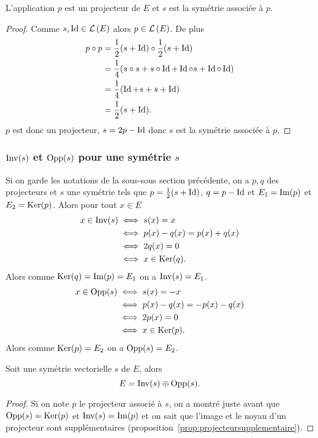 \begin{prop}
  L'application \(p\) est un projecteur de \(E\) et \(s\) est la symétrie
  associée à \(p\).
\end{prop}
\begin{proof}
  Comme \(s, \operatorname{Id} \in \mathcal{L}\left(E\right)\) alors \(p \in \mathcal{L}\left(E\right)\). De plus
  \begin{align}
    p \circ p &= \frac{1}{2}(s+\operatorname{Id}) \circ \frac{1}{2}(s+\operatorname{Id}) \\
    &=\frac{1}{4}(s \circ s + s\circ \operatorname{Id} +\operatorname{Id} \circ s +\operatorname{Id} \circ \operatorname{Id})\\
    &=\frac{1}{4}(\operatorname{Id} +s +s+\operatorname{Id})\\
    &=\frac{1}{2}(s+\operatorname{Id}).
  \end{align}
  \(p\) est donc un projecteur, \(s=2p-\operatorname{Id}\) donc \(s\) est la symétrie associée
  à \(p\).
\end{proof}

\subsubsection{\(\operatorname{Inv}(s)\) et \(\operatorname{Opp}(s)\) pour une symétrie \(s\)}

Si on garde les notations de la sous-sous section précédente, on a \(p,q\) des
projecteurs et \(s\) une symétrie tels que \(p=\frac{1}{2}(s+\operatorname{Id})\), \(q=p-\operatorname{Id}\)
et \(E_1=\operatorname{Im}(p)\) et \(E_2=\operatorname{Ker}(p)\). Alors pour tout \(x \in E\)
\begin{align}
  x \in \operatorname{Inv}(s) &\iff s(x)=x \\
  &\iff p(x)-q(x)=p(x)+q(x) \\
  &\iff 2q(x)=0\\
  &\iff x \in \operatorname{Ker}(q).
\end{align}
Alors comme \(\operatorname{Ker}(q)=\operatorname{Im}(p)=E_1\) on a \(\operatorname{Inv}(s)=E_1\).
\begin{align}
  x \in \operatorname{Opp}(s) &\iff s(x)=-x \\
  &\iff p(x)-q(x)=-p(x)-q(x) \\
  &\iff 2p(x)=0\\
  &\iff x \in \operatorname{Ker}(p).
\end{align}
Alors comme \(\operatorname{Ker}(p)=E_2\) on a \(\operatorname{Opp}(s)=E_2\).
%
\begin{prop}
  Soit une symétrie vectorielle \(s\) de \(E\), alors
  \begin{equation}
    E=\operatorname{Inv}(s) \oplus \operatorname{Opp}(s).
  \end{equation}
\end{prop}
\begin{proof}
  Si on note \(p\) le projecteur associé à \(s\), on a montré juste avant que
  \(\operatorname{Opp}(s)=\operatorname{Ker}(p)\) et \(\operatorname{Inv}(s)=\operatorname{Im}(p)\) et on sait que l'image et le
  noyau d'un projecteur sont supplémentaires (proposition~\ref{prop:projecteursupplementaire}).
\end{proof}

